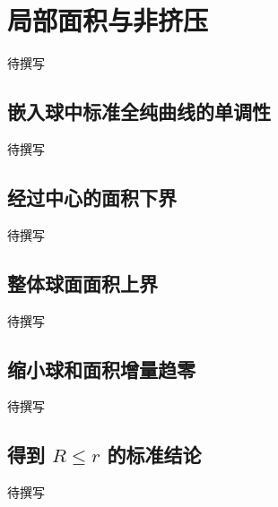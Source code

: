 
% 
% 

\section{局部面积与非挤压}
\label{g4:sec:2404}

待撰写

\subsection{嵌入球中标准全纯曲线的单调性}
\label{g4:subsec:2404:01}
待撰写

\subsection{经过中心的面积下界}
\label{g4:subsec:2404:02}
待撰写

\subsection{整体球面面积上界}
\label{g4:subsec:2404:03}
待撰写

\subsection{缩小球和面积增量趋零}
\label{g4:subsec:2404:04}
待撰写

\subsection{\texorpdfstring{得到 \(R\le r\) 的标准结论}{得到 R≤r 的标准结论}}
\label{g4:subsec:2404:05}
待撰写
